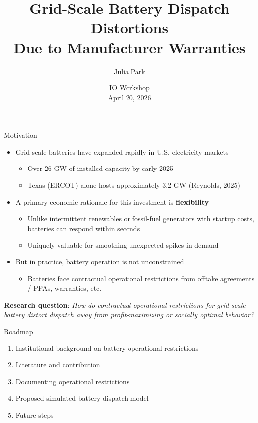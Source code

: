 \documentclass{beamer}
\title{Grid-Scale Battery Dispatch Distortions \\ Due to Manufacturer Warranties}
\author{Julia Park}
\date{IO Workshop \\ April 20, 2026}
\begin{document}
\frame{\titlepage}

\begin{frame}{Motivation}
\begin{itemize}
    \item Grid-scale batteries have expanded rapidly in U.S. electricity markets
    \begin{itemize}
        \item Over 26 GW of installed capacity by early 2025
        \item Texas (ERCOT) alone hosts approximately 3.2 GW (Reynolds, 2025)
    \end{itemize}
    \pause
    \item A primary economic rationale for this investment is \textbf{flexibility}
    \begin{itemize}
        \item Unlike intermittent renewables or fossil-fuel generators with startup costs, batteries can respond within seconds
        \item Uniquely valuable for smoothing unexpected spikes in demand
    \end{itemize}
    \pause
    \item But in practice, battery operation is not unconstrained
    \begin{itemize}
        \item Batteries face contractual operational restrictions from offtake agreements / PPAs, warranties, etc.
    \end{itemize}
\end{itemize}

\textbf{Research question}: \textit{How do contractual operational restrictions for grid-scale battery distort dispatch away from profit-maximizing or socially optimal behavior?}
\end{frame}


\begin{frame}{Roadmap}
    \begin{enumerate}
        \item Institutional background on battery operational restrictions
        \item Literature and contribution
        \item Documenting operational restrictions
        \item Proposed simulated battery dispatch model 
        \item Future steps
    \end{enumerate}
\end{frame}
\end{document}
